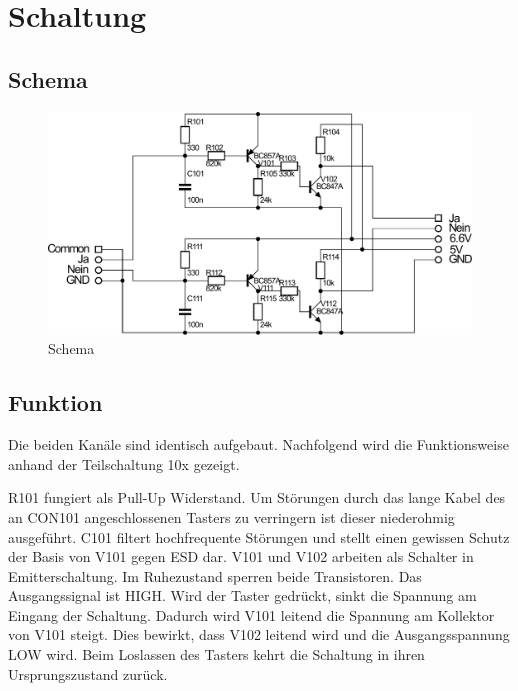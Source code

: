 
\section{Schaltung}

\subsection{Schema}
\begin{figure}[h!]
	\centering
	\includegraphics[scale=\schscale]{fig/xlr_pegelwandler_v_1_2_sch.pdf}
	\caption{Schema}
	\label{sch:pegw}
\end{figure}

\subsection{Funktion}
Die beiden Kanäle sind identisch aufgebaut. Nachfolgend wird die Funktionsweise 
anhand der Teilschaltung 10x gezeigt. 

R101 fungiert als Pull-Up Widerstand. Um Störungen durch das lange Kabel des an 
CON101 angeschlossenen Tasters zu verringern ist dieser niederohmig 
ausgeführt. C101 filtert hochfrequente Störungen und stellt einen gewissen 
Schutz der Basis von V101 gegen ESD dar. V101 und V102 arbeiten als Schalter in 
Emitterschaltung. Im Ruhezustand sperren beide Transistoren. Das Ausgangssignal 
ist HIGH. Wird der Taster gedrückt, sinkt die Spannung am Eingang der 
Schaltung. Dadurch wird V101 leitend die Spannung am Kollektor von V101 steigt. 
Dies bewirkt, dass V102 leitend wird und die Ausgangsspannung LOW wird. Beim 
Loslassen des Tasters kehrt die Schaltung in ihren Ursprungszustand zurück. 

